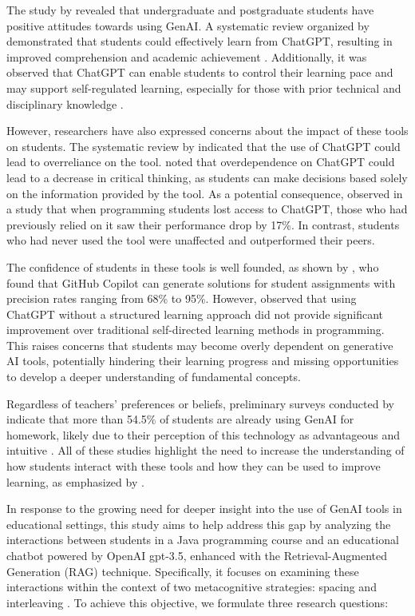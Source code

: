\documentclass[sn-apa]{sn-jnl} %
\begin{document}
The study by \cite{chan23} revealed that undergraduate and postgraduate students
have positive attitudes towards using GenAI. A systematic review organized by
\cite{Lo24} demonstrated that students could effectively learn from ChatGPT,
resulting in improved comprehension and academic achievement \citep{Callejo24}.
Additionally, it was observed that ChatGPT can enable students to control their
learning pace and may support self-regulated learning, especially for those with
prior technical and disciplinary knowledge \citep{Xia23}.

However, researchers have also expressed concerns about the impact of these
tools on students. The systematic review by \cite{Murillo23} indicated that the
use of ChatGPT could lead to overreliance on the tool. \cite{chan23} noted that
overdependence on ChatGPT could lead to a decrease in critical thinking, as
students can make decisions based solely on the information provided by the
tool. As a potential consequence, \cite{Bastani24} observed in a study that when
programming students lost access to ChatGPT, those who had previously relied
on it saw their performance drop by 17\%. In contrast, students who had never
used the tool were unaffected and outperformed their peers.

The confidence of students in these tools is well founded, as shown by
\cite{Puryear22}, who found that GitHub Copilot can generate solutions for
student assignments with precision rates ranging from 68\% to 95\%. However,
\cite{Boudouaia24} observed that using ChatGPT without a structured learning
approach did not provide significant improvement over traditional self-directed
learning methods in programming. This raises concerns that students may become
overly dependent on generative AI tools, potentially hindering their learning
progress and missing opportunities to develop a deeper understanding of
fundamental concepts.

Regardless of teachers' preferences or beliefs, preliminary surveys conducted
by \cite{Dickey24} indicate that more than 54.5\% of students are already using
GenAI for homework, likely due to their perception of this technology as
advantageous and intuitive \citep{Boudouaia24}. All of these studies highlight
the need to increase the understanding of how students interact with these tools
and how they can be used to improve learning, as emphasized by \cite{Lo24}.

In response to the growing need for deeper insight into the use of GenAI tools
in educational settings, this study aims to help address this gap by analyzing
the interactions between students in a Java programming course and an
educational chatbot powered by OpenAI gpt-3.5, enhanced with the
Retrieval-Augmented Generation (RAG) technique. Specifically, it focuses on
examining these interactions within the context of two metacognitive strategies:
spacing \citep{Carvalho20} and interleaving \citep{Rivers21}. To achieve this
objective, we formulate three research questions:
\end{document}
